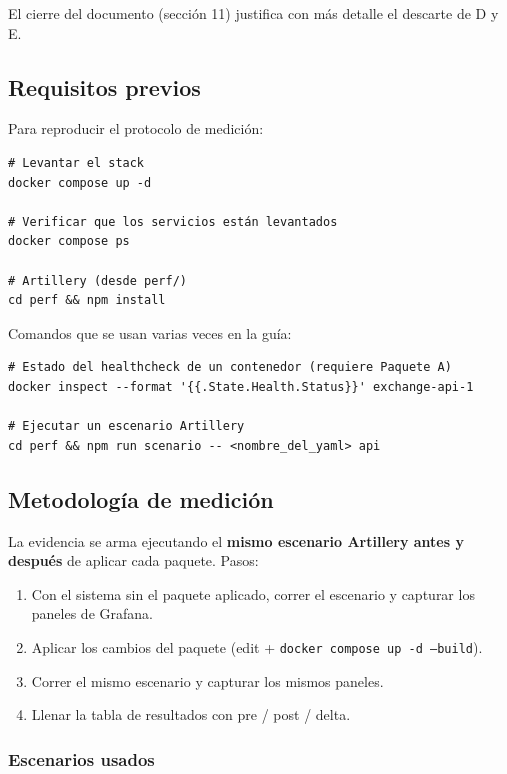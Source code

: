 El cierre del documento (sección 11) justifica con más detalle el descarte de D y E.

\subsection{Requisitos previos}

Para reproducir el protocolo de medición:

\begin{verbatim}
# Levantar el stack
docker compose up -d

# Verificar que los servicios están levantados
docker compose ps

# Artillery (desde perf/)
cd perf && npm install
\end{verbatim}

Comandos que se usan varias veces en la guía:

\begin{verbatim}
# Estado del healthcheck de un contenedor (requiere Paquete A)
docker inspect --format '{{.State.Health.Status}}' exchange-api-1

# Ejecutar un escenario Artillery
cd perf && npm run scenario -- <nombre_del_yaml> api
\end{verbatim}

\subsection{Metodología de medición}

La evidencia se arma ejecutando el \textbf{mismo escenario Artillery antes y después} de aplicar cada paquete. Pasos:

\begin{enumerate}[leftmargin=*]
    \item Con el sistema sin el paquete aplicado, correr el escenario y capturar los paneles de Grafana.
    \item Aplicar los cambios del paquete (edit + \texttt{docker compose up -d --build}).
    \item Correr el mismo escenario y capturar los mismos paneles.
    \item Llenar la tabla de resultados con pre / post / delta.
\end{enumerate}

\subsubsection{Escenarios usados}

